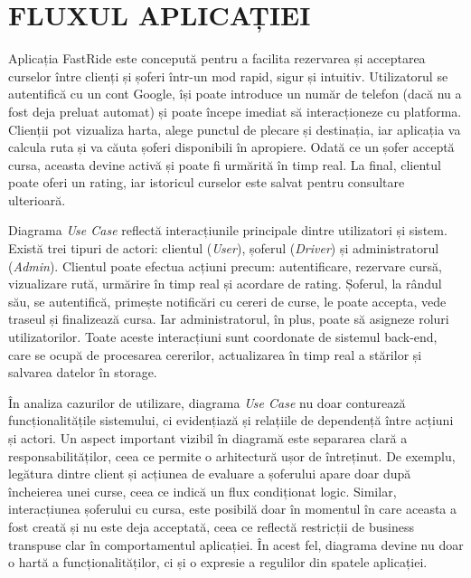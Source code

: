 \chapter{FLUXUL APLICAȚIEI}

Aplicația FastRide este concepută pentru a facilita rezervarea și acceptarea curselor între
clienți și șoferi într-un mod rapid, sigur și intuitiv. Utilizatorul se autentifică
cu un cont Google, își poate introduce un număr de telefon (dacă nu a fost deja 
preluat automat) și poate începe imediat să interacționeze cu platforma.
Clienții pot vizualiza harta, alege punctul de plecare și destinația, iar aplicația
va calcula ruta și va căuta șoferi disponibili în apropiere. Odată ce un șofer 
acceptă cursa, aceasta devine activă și poate fi urmărită în timp real. La final, 
clientul poate oferi un rating, iar istoricul curselor este salvat pentru consultare 
ulterioară.

Diagrama \textit{Use Case} reflectă interacțiunile principale dintre utilizatori și sistem. 
Există trei tipuri de actori: clientul (\textit{User}), șoferul (\textit{Driver}) și administratorul (\textit{Admin}).
Clientul poate efectua acțiuni precum: 
autentificare, rezervare cursă, vizualizare rută, urmărire în timp real și acordare de rating. 
Șoferul, la rândul său, se autentifică, primește 
notificări cu cereri de curse, le poate accepta, vede traseul și finalizează cursa. Iar administratorul, în plus,
poate să asigneze roluri utilizatorilor. 
Toate aceste interacțiuni sunt coordonate de sistemul back-end, care se ocupă de procesarea 
cererilor, actualizarea în timp real a stărilor și salvarea datelor în storage.

În analiza cazurilor de utilizare, diagrama \textit{Use Case} nu doar conturează 
funcționalitățile sistemului, ci evidențiază și relațiile de dependență între acțiuni 
și actori. Un aspect important vizibil în diagramă este separarea clară a 
responsabilităților, ceea ce permite o arhitectură ușor de întreținut. 
De exemplu, legătura dintre client și acțiunea de evaluare a șoferului apare doar 
după încheierea unei curse, ceea ce indică un flux condiționat logic. Similar, 
interacțiunea șoferului cu cursa, este posibilă doar în momentul în care aceasta a 
fost creată și nu este deja acceptată, ceea ce reflectă restricții de business 
transpuse clar în comportamentul aplicației. În acest fel, diagrama devine nu doar o 
hartă a funcționalităților, ci și o expresie a regulilor din spatele aplicației.

